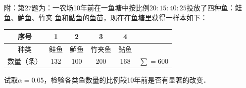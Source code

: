 \begin{enumerate}
\begin{enumerate}
        {\kaishu 附：第27题为：一农场10年前在一鱼塘中按比例$20:15:40:25$投放了四种鱼：鲑鱼、鲈鱼、竹夹
        鱼和鲇鱼的鱼苗，现在在鱼塘里获得一样本如下：
        \renewcommand{\arraystretch}{1.3}
        \begin{table}[H]\centering
            \begin{tabular}{c|ccccc}
            \hline
            序号    & 1   & 2   & 3   & 4   &            \\ \hline
            种类    & 鲑鱼  & 鲈鱼  & 竹夹鱼 & 鲇鱼  &            \\ \hline
            数量（条） & 132 & 100 & 200 & 168 & $\sum=600$ \\ \hline
            \end{tabular}
        \end{table}
        \renewcommand{\arraystretch}{1.0}
        试取$\alpha=0.05$，检验各类鱼数量的比例较10年前是否有显著的改变．}
    \end{enumerate}




  

\end{enumerate}

